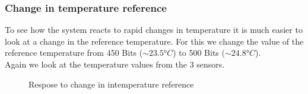 \documentclass[12pt]{scrartcl}
\begin{document}
      \subsubsection{Change in temperature reference}
      To see how the system reacts to rapid changes in temperature it is much
      easier to look at a change in the reference temperature. For this we
      change the value of the reference temperature from 450 Bits ($\sim 23.5 °C$)
      to 500 Bits ($\sim 24.8 °C$). \\
      Again we look at the temperature values from the 3 sensors.
      \begin{figure}[h!]
        \hspace{-40pt}
        \hspace{-20pt}
        \caption{Respose to change in intemperature reference}
        \label{fig12}
      \end{figure} \\
\end{document}
